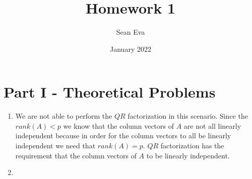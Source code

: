 \documentclass{article}
\title{Homework 1}
\author{Sean Eva}
\date{January 2022}
\begin{document}
\maketitle

\section{Part I - Theoretical Problems}

\begin{enumerate}
    \item 
    
    We are not able to perform the $QR$ factorization in this scenario. Since the $rank(A)<p$ we know that the column vectors of $A$ are not all linearly independent because in order for the column vectors to all be linearly independent we need that $rank(A) = p.$ $QR$ factorization has the requirement that the column vectors of $A$ to be linearly independent.
    
    \item
    

\end{enumerate}
\end{document}
